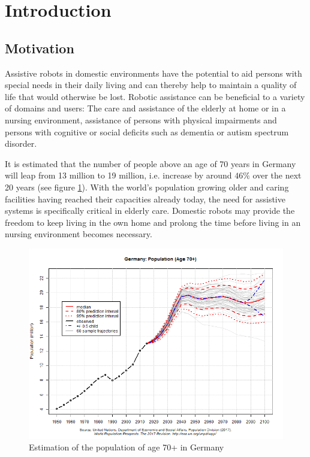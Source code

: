 \section{Introduction}

\subsection{Motivation}
Assistive robots in domestic environments have the potential to aid persons with special needs in their daily living and can thereby help to maintain a quality of life that would otherwise be lost.
Robotic assistance can be beneficial to a variety of domains and users: The care and assistance of the elderly at home or in a nursing environment, assistance of persons with physical impairments and persons with cognitive or social deficits such as dementia or autism spectrum disorder.

It is estimated that the number of people above an age of 70 years in Germany will leap from 13 million to 19 million, i.e. increase by around $46\%$ over the next 20 years (see figure \ref{fig:population_germany}).
With the world's population growing older and caring facilities having reached their capacities already today, the need for assistive systems is specifically critical in elderly care.
Domestic robots may provide the freedom to keep living in the own home and prolong the time before living in an nursing environment becomes necessary.

\begin{figure}[H]
    \centering
    \includegraphics[width=\textwidth]{img_introduction/Germany.png}
    \caption{Estimation of the population of age 70+ in Germany}
    \label{fig:population_germany}
\end{figure}

